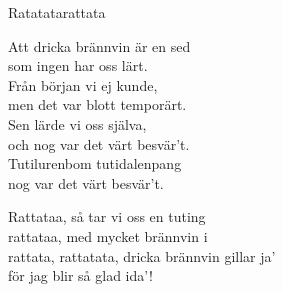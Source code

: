 \begin{song}{Ratatata}{rattata}
\begin{vers}
Att dricka brännvin är en sed\\
som ingen har oss lärt.\\
Från början vi ej kunde,\\
men det var blott temporärt.\\
Sen lärde vi oss själva,\\
och nog var det värt besvär't.\\
Tutilurenbom tutidalenpang\\
nog var det värt besvär't.\\
\end{vers}
\begin{vers}
\repopen Rattataa, så tar vi oss en tuting\\
rattataa, med mycket brännvin i\\
rattata, rattatata, dricka brännvin gillar ja'\\
för jag blir så glad ida'! \repclose\\
\end{vers}
\end{song}
